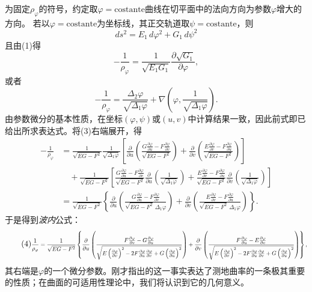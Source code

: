 为固定\(\rho_\varphi\)的符号，约定取\(\varphi=\mathrm{costante}\)曲线在切平面中的法向方向为参数\(\varphi\)增大的方向。
若以\(\varphi=\mathrm{costante}\)为坐标线，其正交轨道取\(\psi=\mathrm{costante}\)，则
\[
 ds^2=E_1\,d\varphi^2+G_1\,d\psi^2
\]
且由(1)得
\[
 -\frac1{\rho_\varphi}=\frac1{\sqrt{E_1G_1}}\frac{\partial\sqrt{G_1}}{\partial\varphi},
\]
或者
\begin{equation}\tag{3}
 -\frac1{\rho_\varphi}=\frac{\Delta_2\varphi}{\sqrt{\Delta_1\varphi}}+\nabla\left(\varphi,\frac1{\sqrt{\Delta_1\varphi}}\right).
\end{equation}
由参数微分的基本性质，在坐标\((\varphi,\psi)\)或\((u,v)\)中计算结果一致，因此前式即已给出所求表达式。将(3)右端展开，得
\[
\begin{aligned}
 -\frac1{\rho_\varphi}
 &=\frac1{\sqrt{EG-F^2}}\frac1{\sqrt{\Delta_1\varphi}}
 \left[\frac{\partial}{\partial u}\left(\frac{G\frac{\partial\varphi}{\partial u}-F\frac{\partial\varphi}{\partial v}}{\sqrt{EG-F^2}}\right)
 +\frac{\partial}{\partial v}\left(\frac{E\frac{\partial\varphi}{\partial v}-F\frac{\partial\varphi}{\partial u}}{\sqrt{EG-F^2}}\right)\right]\\
 &\quad+\frac1{\sqrt{EG-F^2}}\left[
 \frac{G\frac{\partial\varphi}{\partial u}-F\frac{\partial\varphi}{\partial v}}{\sqrt{EG-F^2}}\frac{\partial}{\partial u}\left(\frac1{\sqrt{\Delta_1\varphi}}\right)
 +\frac{E\frac{\partial\varphi}{\partial v}-F\frac{\partial\varphi}{\partial u}}{\sqrt{EG-F^2}}\frac{\partial}{\partial v}\left(\frac1{\sqrt{\Delta_1\varphi}}\right)\right]\\
 &=\frac1{\sqrt{EG-F^2}}\left\{
 \frac{\partial}{\partial u}\left(\frac{G\frac{\partial\varphi}{\partial u}-F\frac{\partial\varphi}{\partial v}}{\sqrt{EG-F^2}\,\Delta_1\varphi}\right)
 +\frac{\partial}{\partial v}\left(\frac{E\frac{\partial\varphi}{\partial v}-F\frac{\partial\varphi}{\partial u}}{\sqrt{EG-F^2}\,\Delta_1\varphi}\right)\right\}.
\end{aligned}
\]
于是得到\emph{波内}公式：
\begin{equation}\tag{4}
\resizebox{\textwidth}{!}{$\displaystyle
 \frac1{\rho_\varphi}=\frac1{\sqrt{EG-F^2}}\left\{
 \frac{\partial}{\partial u}\left(\frac{F\frac{\partial\varphi}{\partial v}-G\frac{\partial\varphi}{\partial u}}{\sqrt{E\left(\frac{\partial\varphi}{\partial v}\right)^2-2F\frac{\partial\varphi}{\partial u}\frac{\partial\varphi}{\partial v}+G\left(\frac{\partial\varphi}{\partial u}\right)^2}}\right)
 +\frac{\partial}{\partial v}\left(\frac{F\frac{\partial\varphi}{\partial u}-E\frac{\partial\varphi}{\partial v}}{\sqrt{E\left(\frac{\partial\varphi}{\partial v}\right)^2-2F\frac{\partial\varphi}{\partial u}\frac{\partial\varphi}{\partial v}+G\left(\frac{\partial\varphi}{\partial u}\right)^2}}\right)
 \right\},
$}
\end{equation}
其右端是\(\varphi\)的一个微分参数。刚才指出的这一事实表达了测地曲率的一条极其重要的性质；在曲面的可适用性理论中，我们将认识到它的几何意义。

